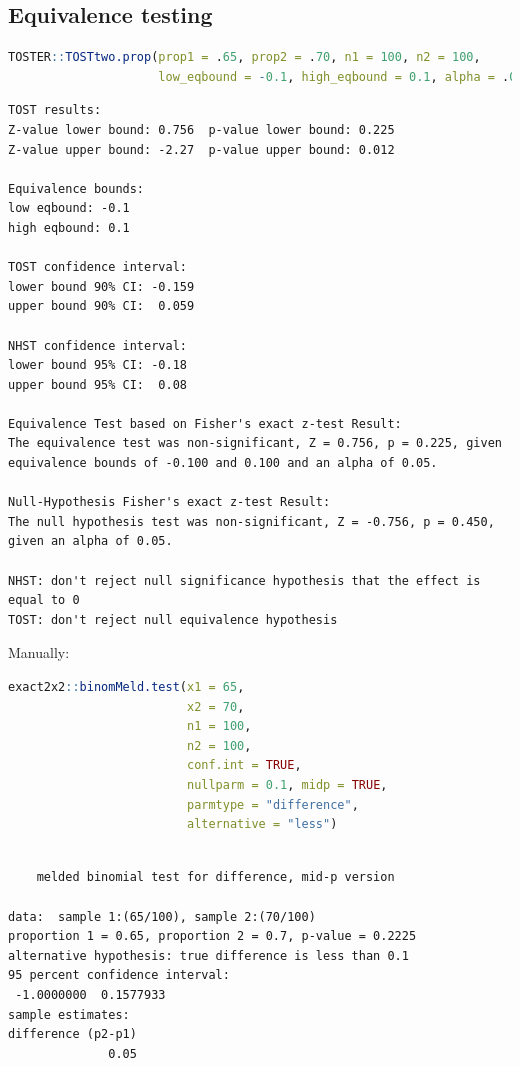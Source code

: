 \documentclass{article}
\begin{document}
\subsection{Equivalence testing}
\label{sec:org2eececf}

\begin{lstlisting}[language=r,numbers=none]
TOSTER::TOSTtwo.prop(prop1 = .65, prop2 = .70, n1 = 100, n2 = 100,
                     low_eqbound = -0.1, high_eqbound = 0.1, alpha = .05)
\end{lstlisting}

\label{}
\begin{verbatim}
TOST results:
Z-value lower bound: 0.756 	p-value lower bound: 0.225
Z-value upper bound: -2.27 	p-value upper bound: 0.012

Equivalence bounds:
low eqbound: -0.1 
high eqbound: 0.1

TOST confidence interval:
lower bound 90% CI: -0.159
upper bound 90% CI:  0.059

NHST confidence interval:
lower bound 95% CI: -0.18
upper bound 95% CI:  0.08

Equivalence Test based on Fisher's exact z-test Result:
The equivalence test was non-significant, Z = 0.756, p = 0.225, given equivalence bounds of -0.100 and 0.100 and an alpha of 0.05.

Null-Hypothesis Fisher's exact z-test Result:
The null hypothesis test was non-significant, Z = -0.756, p = 0.450, given an alpha of 0.05.

NHST: don't reject null significance hypothesis that the effect is equal to 0 
TOST: don't reject null equivalence hypothesis
\end{verbatim}

Manually:
\begin{lstlisting}[language=r,numbers=none]
exact2x2::binomMeld.test(x1 = 65,
                         x2 = 70,
                         n1 = 100,
                         n2 = 100, 
                         conf.int = TRUE,
                         nullparm = 0.1, midp = TRUE,
                         parmtype = "difference",
                         alternative = "less")
\end{lstlisting}

\label{}
\begin{verbatim}

	melded binomial test for difference, mid-p version

data:  sample 1:(65/100), sample 2:(70/100)
proportion 1 = 0.65, proportion 2 = 0.7, p-value = 0.2225
alternative hypothesis: true difference is less than 0.1
95 percent confidence interval:
 -1.0000000  0.1577933
sample estimates:
difference (p2-p1) 
              0.05
\end{verbatim}
\end{document}
